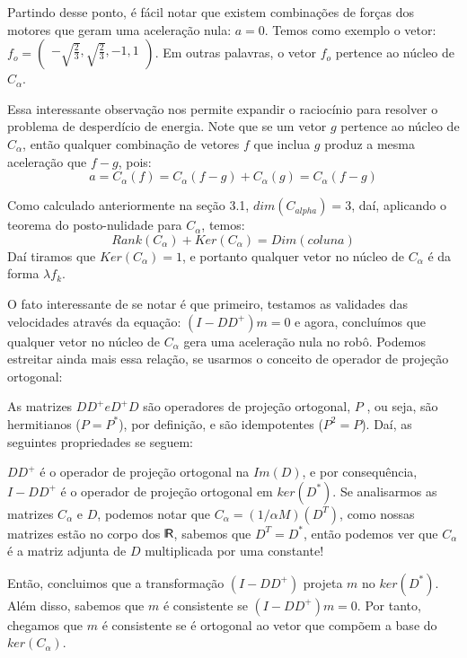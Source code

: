 \documentclass{article}
\def\bkRsf{{\sf \mbox{\vrule height0.705em width0.06em
            depth0em}\kern-.04em R}}
\begin{document}
Partindo desse ponto, é fácil notar que existem combinações de forças dos motores que geram uma aceleração nula: $ a = 0 $. Temos como exemplo o vetor: $f_{o} = \begin{pmatrix} -\sqrt{\frac{2}{3}},\sqrt{\frac{2}{3}},-1,1\end{pmatrix}$. Em outras palavras, o vetor $f_{o}$ pertence ao núcleo de $C_{\alpha}$.

Essa interessante observação nos permite expandir o raciocínio para resolver o problema de desperdício de energia. Note que se um vetor $g$ pertence ao núcleo de $C_{\alpha}$, então qualquer combinação de vetores $f$ que inclua $g$ produz a mesma aceleração que $f - g$, pois:
\[ a = C_{\alpha}(f) = C_{\alpha}(f-g) + C_{\alpha}(g) = C_{\alpha}(f-g)\]


Como calculado anteriormente na seção 3.1, $dim(C_{alpha}) = 3$, daí, aplicando o teorema do posto-nulidade para $C_{\alpha}$, temos:
\[Rank(C_{\alpha}) + Ker(C_{\alpha}) = Dim(coluna)\]
Daí tiramos que $Ker(C_{\alpha}) = 1 $, e portanto qualquer vetor no núcleo de $C_{\alpha}$ é da forma $\lambda f_{k}$.

O fato interessante de se notar é que primeiro, testamos as validades das velocidades através da equação: $(I-DD^+)m = 0$ e agora, concluímos que qualquer vetor no núcleo de $C_{\alpha}$ gera uma aceleração nula no robô. Podemos estreitar ainda mais essa relação, se usarmos o conceito de operador de projeção ortogonal:

As matrizes $DD^+ e D^+D$ são operadores de projeção ortogonal, $P$ , ou seja, são hermitianos ($P = P^*$), por definição, e são idempotentes ($P^2 = P$). Daí, as seguintes propriedades se seguem:

$DD^+$ é o operador de projeção ortogonal na $Im(D)$, e por consequência, $I - DD^+$ é o operador de projeção ortogonal em $ker(D^*)$.
Se analisarmos as matrizes $C_{\alpha}$ e $D$, podemos notar que $C_{\alpha} = (1/{\alpha}M)(D^T)$, como nossas matrizes estão no corpo dos $\bkRsf$, sabemos que $D^T = D^*$, então podemos ver que $C_{\alpha}$ é a matriz adjunta de $D$ multiplicada por uma constante!

Então, concluimos que a transformação $(I-DD^+)$ projeta $m$ no $ker(D^*)$. Além disso, sabemos que $m$ é consistente se $(I-DD^+)m = 0$. Por tanto, chegamos que $m$ é consistente se é ortogonal ao vetor que compõem a base do $ker(C_{\alpha})$.
\end{document}
